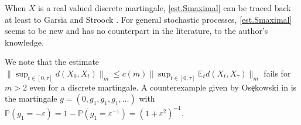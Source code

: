\documentclass[12pt,oneside,reqno,fleqn]{amsart}
\numberwithin{equation}{section}
\theoremstyle{remark}
\newcommand\mE{{\mathbb E}}
\newcommand\E{\mE}
\newcommand\PP{{\mathbb P}}
\newcommand{\1}{{\mathbf 1}}
\newcommand{\wei}[1]{\langle#1\rangle}
\renewcommand{\le}{\leq}
\begin{document}
	
	When $X$ is a real valued discrete martingale, \eqref{est.Smaximal} can be traced back at least to Garsia \cite[Theorem III.5.2]{MR0448538} and Stroock \cite{MR341601}. 
	For general stochastic processes, \eqref{est.Smaximal} seems to be new and has no counterpart in the literature, to the author's knowledge.

	We note that the estimate $\|\sup_{t\in[0,\tau]}d(X_0,X_t)\|_m\le c(m)\|\sup_{t\in[0,\tau]}\E_td(X_{t},X_\tau)\|_m $ fails for $m>2$ even for a discrete martingale. A counterexample given by Os\c{e}kowski in \cite{MR3426632} is the martingale $g=(0,g_1,g_1,g_1,\ldots)$ with $\PP(g_1=-\varepsilon)=1-\PP(g_1=\varepsilon^{-1})=(1+\varepsilon^2)^{-1}$.
\end{document}
